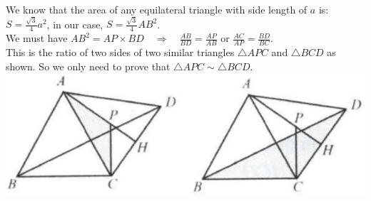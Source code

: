 \documentclass[10pt]{article}
\begin{document}
We know that the area of any equilateral triangle with side length of \(a\) is:\\
\(S=\frac{\sqrt{3}}{4} a^{2}\), in our case, \(S=\frac{\sqrt{3}}{4} A B^{2}\).\\
We must have \(A B^{2}=A P \times B D \quad \Rightarrow \quad \frac{A B}{B D}=\frac{A P}{A B}\) or \(\frac{A C}{A P}=\frac{B D}{B C}\).\\
This is the ratio of two sides of two similar triangles \(\triangle A P C\) and \(\triangle B C D\) as shown. So we only need to prove that \(\triangle A P C \sim \triangle B C D\).\\
\includegraphics[max width=\textwidth, center]{2025_04_17_97bc1f7e44d93c271a88g-199(1)}
\end{document}
